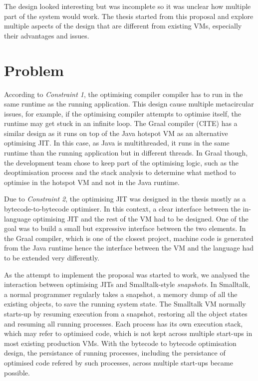 \documentclass[a4paper,12pt,twoside]{../includes/ThesisStyle}
\begin{document}
The design looked interesting but was incomplete so it was unclear how multiple part of the system would work. The thesis started from this proposal and explore multiple aspects of the design that are different from existing VMs, especially their advantages and issues.

\section{Problem}

According to \emph{Constraint 1}, the optimising compiler compiler has to run in the same runtime as the running application. This design cause multiple metacircular issues, for example, if the optimising compiler attempts to optimise itself, the runtime may get stuck in an infinite loop. The Graal compiler (CITE) has a similar design as it runs on top of the Java hotspot VM as an alternative optimising JIT. In this case, as Java is multithreaded, it runs in the same runtime than the running application but in different threads. In Graal though, the development team chose to keep part of the optimising logic, such as the deoptimisation process and the stack analysis to determine what method to optimise in the hotspot VM and not in the Java runtime. 

Due to \emph{Constraint 2}, the optimising JIT was designed in the thesis mostly as a bytecode-to-bytecode optimiser. In this context, a clear interface between the in-language optimising JIT and the rest of the VM had to be designed. One of the goal was to build a small but expressive interface between the two elements. In the Graal compiler, which is one of the closest project, machine code is generated from the Java runtime hence the interface between the VM and the language had to be extended very differently.

As the attempt to implement the proposal was started to work, we analysed the interaction between optimising JITs and Smalltalk-style \emph{snapshots}. In Smalltalk, a normal programmer regularly takes a snapshot, a memory dump of all the existing objects, to save the running system state. The Smalltalk VM normally starts-up by resuming execution from a snapshot, restoring all the object states and resuming all running processes. Each process has its own execution stack, which may refer to optimised code, which is not kept across multiple start-ups in most existing production VMs. With the bytecode to bytecode optimisation design, the persistance of running processes, including the persistance of optimised code refered by such processes, across multiple start-ups became possible.
\end{document}
